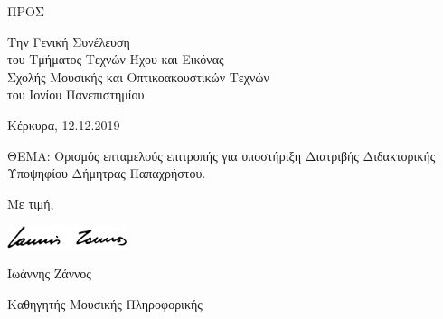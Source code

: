 \documentclass[a4, 11pt]{article}
\begin{document}

\vspace{1cm}

\thispagestyle{empty}
\noindent
ΠΡΟΣ

\vspace{0.5cm}

\noindent
Την Γενική Συνέλευση\\
του Τμήματος Τεχνών Ήχου και Εικόνας\\
Σχολής Μουσικής και Οπτικοακουστικών Τεχνών\\
του Ιονίου Πανεπιστημίου

\vspace{0.5cm}
\noindent
Κέρκυρα, 12.12.2019

\vspace{0.5cm}
\noindent
ΘΕΜΑ: Ορισμός επταμελούς επιτροπής για υποστήριξη Διατριβής Διδακτορικής Υποψηφίου Δήμητρας Παπαχρήστου.

\vspace{0.5cm}



\vspace{0.25cm}

Με τιμή,

\vspace{1cm}

\vspace{0.5cm}
\setlength{\parindent}{6cm}
\includegraphics[width=3.5cm]{signature}

\vspace{0.5cm}

Ιωάννης Ζάννος

Καθηγητής Μουσικής Πληροφορικής
\end{document}
